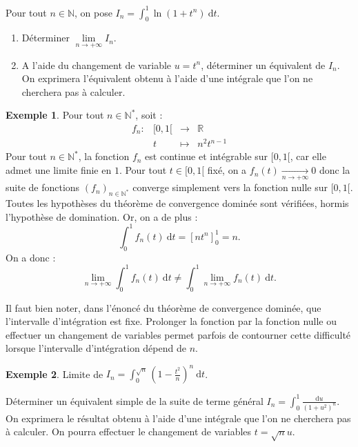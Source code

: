 \documentclass[french]{article}
\newcommand{\N}{\mathbb{N}}
\newcommand{\R}{\mathbb{R}}
\newcommand{\st}{^*}
\renewcommand{\d}{\text{d}}
\theoremstyle{plain}
\theoremstyle{definition}
\newtheorem*{ex}{Exemple}
\theoremstyle{remark}
\begin{document}
\begin{exo}
	Pour tout $n\in\N$, on pose $\displaystyle I_n=\int_{0}^{1}\ln(1+t^n)\ \d t$.
	\begin{enumerate}
		\item Déterminer $\underset{n\to+\infty}{\lim} I_n$.
		\item A l'aide du changement de variable $u=t^n$, déterminer un équivalent de $I_n$. On exprimera l'équivalent obtenu à l'aide d'une intégrale que l'on ne cherchera pas à calculer.
	\end{enumerate}
\end{exo}

\begin{ex}
	Pour tout $n\in\N\st$, soit : $$\begin{array}{lrcl}
		f_n:&[0,1[&\longrightarrow&\R\\
		&t&\longmapsto&n^2t^{n-1}
	\end{array}$$ Pour tout $n\in\N\st$, la fonction $f_n$ est continue et intégrable sur $[0,1[$, car elle admet une limite finie en $1$. Pour tout $t\in[0,1[$ fixé, on a $f_n(t)\xrightarrow[n\to+\infty]{}0$ donc la suite de fonctions $(f_n)_{n\in\N\st}$ converge simplement vers la fonction nulle sur $[0,1[$. Toutes les hypothèses du théorème de convergence dominée sont vérifiées, hormis l'hypothèse de domination. Or, on a de plus : $$\int_{0}^{1}f_n(t)\ \d t=[nt^n]_{0}^{1}=n.$$ On a donc : $$\underset{n\to+\infty}{\lim}\int_{0}^{1}f_n(t)\ \d t\ne \int_{0}^{1}\underset{n\to+\infty}{\lim}f_n(t)\ \d t.$$
\end{ex}

\begin{met}
	Il faut bien noter, dans l'énoncé du théorème de convergence dominée, que l'intervalle d'intégration est fixe. Prolonger la fonction par la fonction nulle ou effectuer un changement de variables permet parfois de contourner cette difficulté lorsque l'intervalle d'intégration dépend de $n$.
\end{met}

\begin{ex}
	Limite de $\displaystyle I_n=\int_{0}^{\sqrt{n}}\left(1-\frac{t^2}{n}\right)^n\ \d t$.
\end{ex}

\begin{exo}
	Déterminer un équivalent simple de la suite de terme général $I_n=\displaystyle\int_{0}^{1}\frac{\d u}{(1+u^2)^n}$. On exprimera le résultat obtenu à l'aide d'une intégrale que l'on ne cherchera pas à calculer. On pourra effectuer le changement de variables $t=\sqrt{n}u$.
\end{exo}
\end{document}
